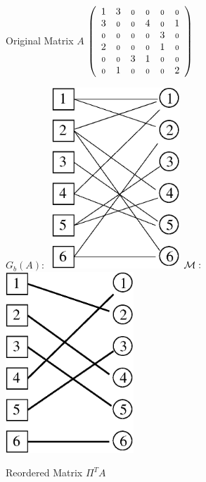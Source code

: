 \begin{figure}
\begin{minipage}{.33\textwidth}
 \begin{center}
 Original Matrix $A$
    $\left(
%
        \begin{array}{cccccc}
         1 & 3 & \nl & \nl & \nl & \nl \\
          3  & \nl & \nl & 4 & \nl & 1 \\
        \nl & \nl & \nl & \nl &  3  & \nl \\
        2 &  \nl  & \nl & \nl & 1 & \nl \\
        \nl & \nl &  3  & 1 & \nl & \nl \\
        \nl & 1 & \nl & \nl & \nl &  2
        \end{array}
    \right) $ 
 \end{center}
\end{minipage}
\begin{minipage}{.32\textwidth}
 \begin{center}
$G_b(A): \;$ 
\includegraphics[width=0.43\textwidth]{figures/matching1} 
%
%
\hspace{0.5cm}$\mathcal{M}: \;$ 
\includegraphics[width=0.43\textwidth]{figures/matching2} 
 \end{center}
\end{minipage}
\begin{minipage}{.32\textwidth}
  \begin{center}
Reordered Matrix $\Pi^TA$


\end{center}
\end{minipage}
\end{figure}

